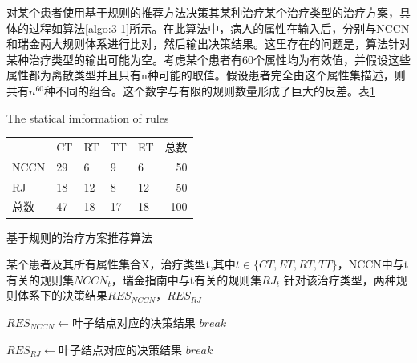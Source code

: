 对某个患者使用基于规则的推荐方法决策其某种治疗某个治疗类型的治疗方案，具体的过程如算法\ref{algo:3-1}所示。在此算法中，病人的属性在输入后，分别与NCCN和瑞金两大规则体系进行比对，然后输出决策结果。这里存在的问题是，算法针对某种治疗类型的输出可能为空。考虑某个患者有60个属性均为有效值，并假设这些属性都为离散类型并且只有n种可能的取值。假设患者完全由这个属性集描述，则共有$n^{60}$种不同的组合。这个数字与有限的规则数量形成了巨大的反差。表\ref{tab:3-2}



\begin{table}[!hpb]
  \centering
    {The statical imformation of rules}
  \label{tab:3-2}
  \begin{tabular}{@{}lllllr@{}} \toprule

      & CT & RT & TT & ET & 总数\\ 

    NCCN & 29 & 6 & 9 & 6 & 50 \\
    RJ & 18 & 12 & 8 & 12 & 50 \\ \midrule
    总数 & 47 & 18 & 17 & 18 & 100 \\

  \end{tabular}
\end{table}




\begin{algorithm}
\caption{基于规则的治疗方案推荐算法}
\label{algo:3-1}
\begin{algorithmic}[1] %
\Require 某个患者及其所有属性集合X，治疗类型t,其中${t \in \{CT,ET,RT,TT\}}$，NCCN中与t有关的规则集${NCCN_t}$，瑞金指南中与t有关的规则集${RJ_t}$
\Ensure 针对该治疗类型，两种规则体系下的决策结果${RES_{NCCN}}$，${RES_{RJ}}$

        \State $ RES_{NCCN} \gets \text{叶子结点对应的决策结果} $
        \State $ break $
    \EndIf
\EndFor

        \State $ RES_{RJ} \gets \text{叶子结点对应的决策结果} $
        \State $ break $
    \EndIf
\EndFor


\end{algorithmic}
\end{algorithm}


